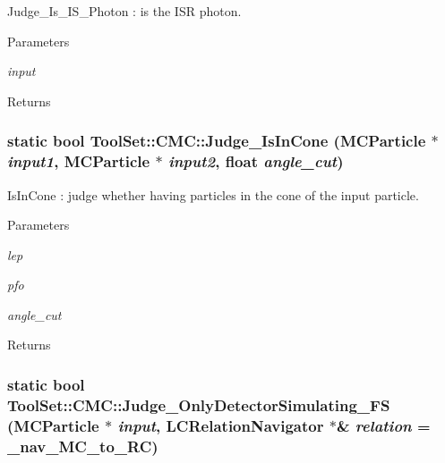 Judge\_\-Is\_\-IS\_\-Photon : is the ISR photon. 
\begin{DoxyParams}{Parameters}
\item[{\em input}]\end{DoxyParams}
\begin{DoxyReturn}{Returns}

\end{DoxyReturn}
\hypertarget{classToolSet_1_1CMC_a63e419bc0a7ce9d4573476d8432e84cb}{
\subsubsection[{Judge\_\-IsInCone}]{\setlength{\rightskip}{0pt plus 5cm}static bool ToolSet::CMC::Judge\_\-IsInCone (MCParticle $\ast$ {\em input1}, \/  MCParticle $\ast$ {\em input2}, \/  float {\em angle\_\-cut})}}
\label{classToolSet_1_1CMC_a63e419bc0a7ce9d4573476d8432e84cb}


IsInCone : judge whether having particles in the cone of the input particle. 
\begin{DoxyParams}{Parameters}
\item[{\em lep}]\item[{\em pfo}]\item[{\em angle\_\-cut}]\end{DoxyParams}
\begin{DoxyReturn}{Returns}

\end{DoxyReturn}
\hypertarget{classToolSet_1_1CMC_a158579bb5adfcfa9e0b4bbaba7ee3229}{
\subsubsection[{Judge\_\-OnlyDetectorSimulating\_\-FS}]{\setlength{\rightskip}{0pt plus 5cm}static bool ToolSet::CMC::Judge\_\-OnlyDetectorSimulating\_\-FS (MCParticle $\ast$ {\em input}, \/  LCRelationNavigator $\ast$\& {\em relation} = {\ttfamily \_\-nav\_\-MC\_\-to\_\-RC})}}
\label{classToolSet_1_1CMC_a158579bb5adfcfa9e0b4bbaba7ee3229}


